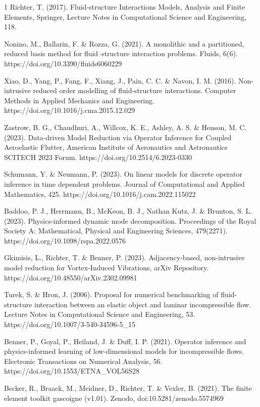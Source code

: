\documentclass[%
  onecolumn
]{mpi2015-cscpreprint}
\begin{document}
\begin{thebibliography}{1}
% 
Richter, T. (2017). Fluid-structure Interactions Models, Analysis and Finite Elements, Springer, Lecture Notes in Computational Science and Engineering, 118.

% 
 Nonino, M., Ballarin, F. \& Rozza, G. (2021). A monolithic and a partitioned, reduced basis method for fluid–structure interaction problems. Fluids, 6(6). https://doi.org/10.3390/fluids6060229
 
% 
Xiao, D., Yang, P., Fang, F., Xiang, J., Pain, C. C. \& Navon, I. M. (2016). Non-intrusive reduced order modelling of fluid-structure interactions. Computer Methods in Applied Mechanics and Engineering. https://doi.org/10.1016/j.cma.2015.12.029

% 
Zastrow, B. G., Chaudhuri, A., Willcox, K. E., Ashley, A. S. \& Henson, M. C. (2023). Data-driven Model Reduction via Operator Inference for Coupled Aeroelastic Flutter, American Institute of Aeronautics and Astronautics SCITECH 2023 Forum. https://doi.org/10.2514/6.2023-0330

% 
Schumann, Y. \& Neumann, P. (2023). On linear models for discrete operator inference in time dependent problems. Journal of Computational and Applied Mathematics, 425. https://doi.org/10.1016/j.cam.2022.115022

% 
Baddoo, P. J., Herrmann, B., McKeon, B. J., Nathan Kutz, J. \& Brunton, S. L. (2023). Physics-informed dynamic mode decomposition. Proceedings of the Royal Society A: Mathematical, Physical and Engineering Sciences, 479(2271). https://doi.org/10.1098/rspa.2022.0576

% 
Gkimisis, L., Richter, T. \& Benner, P. (2023). Adjacency-based, non-intrusive model reduction for Vortex-Induced Vibrations, arXiv Repository. 
https://doi.org/10.48550/arXiv.2302.09981

Turek, S. \& Hron, J. (2006). Proposal for numerical benchmarking of fluid-structure interaction between an elastic object and laminar incompressible flow. Lecture Notes in Computational Science and Engineering, 53. https://doi.org/10.1007/3-540-34596-5\_15


 
% 
Benner, P., Goyal, P., Heiland, J. \& Duff, I. P. (2021). Operator inference and physics-informed learning of low-dimensional models for incompressible flows. Electronic Transactions on Numerical Analysis, 56. https://doi.org/10.1553/ETNA\_VOL56S28



Becker, R., Braack, M., Meidner, D., Richter, T. \& Vexler, B. (2021). The finite element toolkit gascoigne (v1.01). Zenodo, doi:10.5281/zenodo.5574969
\end{thebibliography}
\end{document}
